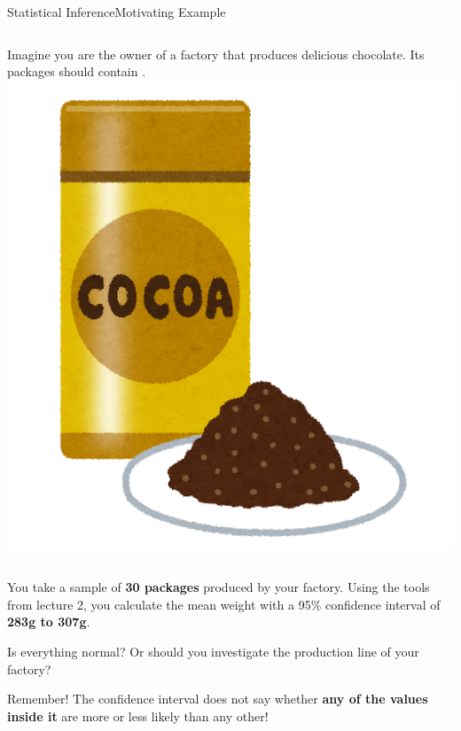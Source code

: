 \begin{frame}{Statistical Inference}{Motivating Example}

  \begin{columns}
    Imagine you are the owner of a factory that produces delicious chocolate. Its packages should contain .
    \hfill\includegraphics[width=1\textwidth]{../img/irasutoya_cocoa}
  \end{columns}

  You take a sample of {\bf 30 packages} produced by your factory. Using the tools from lecture 2, you calculate the mean weight with a 95\% confidence interval of {\bf 283g to 307g}.\bigskip

  Is everything normal? Or should you investigate the production line of your factory?\bigskip

  \begin{alertblock}{Remember!}
    The confidence interval does not say whether {\bf any of the values inside it} are more or less likely than any other!
  \end{alertblock}
\end{frame}


